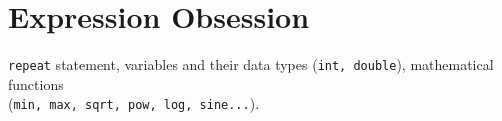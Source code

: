 \section{Expression Obsession}{\label{sec:expressionobsession}}
\begin{topics}
\verb!repeat! statement, variables and their data types (\verb!int, double!), mathematical functions \\(\verb!min, max, sqrt, pow, log, sine...!).
\end{topics}









